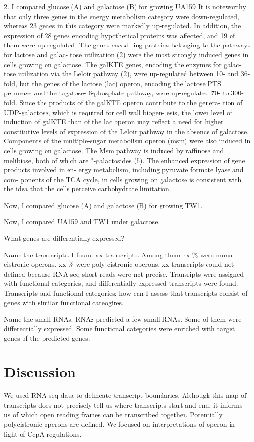 \documentclass{article}
\begin{document}
2. I compared glucose (A) and galactose (B) for growing UA159
It is noteworthy that only three genes in the energy metabolism category were
down-regulated, whereas 23 genes in this category were markedly up-regulated. In
addition, the expression of 28 genes encoding hypothetical proteins was affected,
and 19 of them were up-regulated. The genes encod- ing proteins belonging to the
pathways for lactose and galac- tose utilization (2) were the most strongly
induced genes in cells growing on galactose. The galKTE genes, encoding the
enzymes for galac- tose utilization via the Leloir pathway (2), were
up-regulated between 10- and 36-fold, but the genes of the lactose (lac) operon,
encoding the lactose PTS permease and the tagatose- 6-phosphate pathway, were
up-regulated 70- to 300-fold. Since the products of the galKTE operon contribute
to the genera- tion of UDP-galactose, which is required for cell wall biogen-
esis, the lower level of induction of galKTE than of the lac operon may reflect
a need for higher constitutive levels of expression of the Leloir pathway in the
absence of galactose. Components of the multiple-sugar metabolism operon (msm)
were also induced in cells growing on galactose. The Msm pathway is induced by
raffinose and melibiose, both of which are ?-galactosides (5). The enhanced
expression of gene products involved in en- ergy metabolism, including pyruvate
formate lyase and com- ponents of the TCA cycle, in cells growing on galactose
is consistent with the idea that the cells perceive carbohydrate limitation. 

Now, I compared glucose (A) and galactose (B) for growing TW1. 

Now, I compared UA159 and TW1 under galactose. 

What genes are differentially expressed? 

Name the transcripts.
I found xx transcripts. Among them xx \% were mono-cistronic operons. xx \% were
poly-cistronic operons. xx transcripts could not defined because RNA-seq short
reads were not precise. Transripts were assigned with functional categories, and
differentially expressed transcripts were found. Transcripts and functional
categories: how can I assess that transcripts consist of genes with similar
functional cateogires. 

Name the small RNAs.
RNAz predicted a few small RNAs. Some of them were differentially expressed.
Some functional categories were enriched with target genes of the predicted
genes. 

\section{Discussion}
We used RNA-seq data to delineate transcript boundaries. Although this map of
transcripts does not precisely tell us where transcripts start and end, it
informs us of which open reading frames can be transcribed together. Potentially
polycistronic operons are defined. We focused on interpretations of operon in
light of CcpA regulations. 
\end{document}
